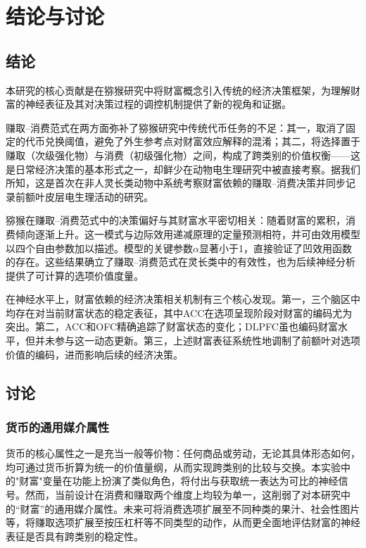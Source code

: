 \chapter{结论与讨论}\label{chap4:discussion}

\section{结论}\label{chap4_1:conclusion}

本研究的核心贡献是在猕猴研究中将财富概念引入传统的经济决策框架，为理解财富的神经表征及其对决策过程的调控机制提供了新的视角和证据。

赚取–消费范式在两方面弥补了猕猴研究中传统代币任务的不足：其一，取消了固定的代币兑换阈值，避免了外生参考点对财富效应解释的混淆；其二，将选择置于赚取（次级强化物）与消费（初级强化物）之间，构成了跨类别的价值权衡——这是日常经济决策的基本形式之一，却鲜少在动物电生理研究中被直接考察。据我们所知，这是首次在非人灵长类动物中系统考察财富依赖的赚取–消费决策并同步记录前额叶皮层电生理活动的研究。

猕猴在赚取–消费范式中的决策偏好与其财富水平密切相关：随着财富的累积，消费倾向逐渐上升。这一模式与边际效用递减原理的定量预测相符，并可由效用模型以四个自由参数加以描述。模型的关键参数$\alpha$显著小于1，直接验证了凹效用函数的存在。这些结果确立了赚取–消费范式在灵长类中的有效性，也为后续神经分析提供了可计算的选项价值度量。

在神经水平上，财富依赖的经济决策相关机制有三个核心发现。第一，三个脑区中均存在对当前财富状态的稳定表征，其中ACC在选项呈现阶段对财富的编码尤为突出。第二，ACC和OFC精确追踪了财富状态的变化；DLPFC虽也编码财富水平，但并未参与这一动态更新。第三，上述财富表征系统性地调制了前额叶对选项价值的编码，进而影响后续的经济决策。

\section{讨论}\label{chap4_2:discussion}

\subsection{货币的通用媒介属性}\label{chap4_2_1:serial_parallel}
货币的核心属性之一是充当一般等价物：任何商品或劳动，无论其具体形态如何，均可通过货币折算为统一的价值量纲，从而实现跨类别的比较与交换。本实验中的"财富"变量在功能上扮演了类似角色，将付出与获取统一表达为可比的神经信号。然而，当前设计在消费和赚取两个维度上均较为单一，这削弱了对本研究中的“财富”的通用媒介属性。未来可将消费选项扩展至不同种类的果汁\citep{padoaschioppa2006neurons}、社会性图片\citep{deaner2005monkeys}等，将赚取选项扩展至按压杠杆\citep{kennerley2009neurons}等不同类型的动作，从而更全面地评估财富的神经表征是否具有跨类别的稳定性。


